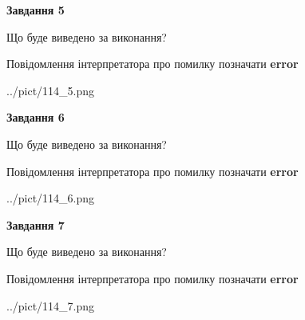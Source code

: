 \documentclass[10pt, ukrainian]{article}
\begin{document}
{\begin {large}
{\begin {center}\textbf{Завдання 5}\end {center}}\par
Що буде виведено за виконання? \par
Повідомлення інтерпретатора про помилку позначати \textbf{error}

\begin{center}
	{../pict/114_5.png}
\end{center}
\newpage

{\begin {center}\textbf{Завдання 6}\end {center}}\par
Що буде виведено за виконання? \par
Повідомлення інтерпретатора про помилку позначати \textbf{error}

\begin{center}
	{../pict/114_6.png}
\end{center}
\newpage

{\begin {center}\textbf{Завдання 7}\end {center}}\par
Що буде виведено за виконання? \par
Повідомлення інтерпретатора про помилку позначати \textbf{error}

\begin{center}
	{../pict/114_7.png}
\end{center}
\newpage

\end {large}}
\end{document}

